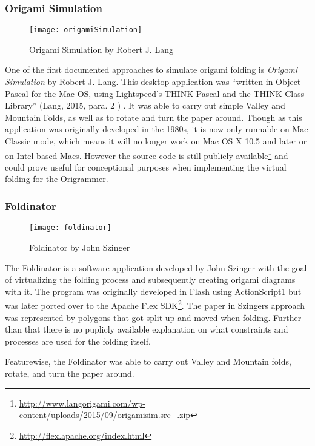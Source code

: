 \subsubsection{Origami Simulation}
\begin{figure}[htbp]
	\centering
	\texttt{[image: origamiSimulation]}
	\caption{Origami Simulation by Robert J. Lang}
	\label{fig:origamiSimulation}
\end{figure}
\noindent One of the first documented approaches to simulate origami folding is \emph{Origami Simulation} \cite{origamiSimulation} by Robert J. Lang. This desktop application was ``written in Object Pascal for the Mac OS, using Lightspeed's THINK Pascal and the THINK Class Library'' (Lang, 2015, para. 2 \cite{origamiSimulation}) . It was able to carry out simple Valley and Mountain Folds, as well as to rotate and turn the paper around.
Though as this application was originally developed in the 1980s, it is now only runnable on Mac Classic mode, which means it will no longer work on Mac OS X 10.5 and later or on Intel-based Macs. However the source code is still publicly available\footnote{\url{http://www.langorigami.com/wp-content/uploads/2015/09/origamisim.src_.zip}} and could prove useful for conceptional purposes when implementing the virtual folding for the Origrammer.

\subsubsection{Foldinator}
 \begin{figure}[htbp]
	\centering
	\texttt{[image: foldinator]}
	\caption{Foldinator by John Szinger}
	\label{fig:foldinator}
\end{figure}

\noindent The Foldinator \cite{foldinator} is a software application developed by John Szinger with the goal of virtualizing the folding process and subsequently creating origami diagrams with it.
The program was originally developed in Flash using ActionScript1 but was later ported over to the Apache Flex SDK\footnote{\url{http://flex.apache.org/index.html}}. The paper in Szingers approach was represented by polygons that got split up and moved when folding. Further than that there is no puplicly available explanation on what constraints and processes are used for the folding itself.

Featurewise, the Foldinator was able to carry out Valley and Mountain folds, rotate, and turn the paper around.

